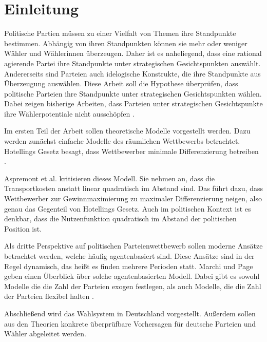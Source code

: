 
\chapter{Einleitung}\label{Kap-Einleitung}
Politische Partien müssen zu einer Vielfalt von Themen ihre Standpunkte bestimmen. Abhängig von ihren Standpunkten können sie mehr oder weniger Wähler und Wählerinnen überzeugen. Daher ist es naheliegend, dass eine rational agierende Partei ihre Standpunkte unter strategischen Gesichtspunkten auswählt. Andererseits sind Parteien auch idelogische Konstrukte, die ihre Standpunkte aus Überzeugung auswählen. Diese Arbeit soll die Hypothese überprüfen, dass politische Parteien ihre Standpunkte unter strategischen Gesichtspunkten wählen. Dabei zeigen bisherige Arbeiten, dass Parteien unter strategischen Gesichtspunkte ihre Wählerpotentiale nicht ausschöpfen \citep{schofield1998germany}.

Im ersten Teil der Arbeit sollen theoretische Modelle vorgestellt werden. Dazu werden  zunächst einfache Modelle des räumlichen Wettbewerbs betrachtet. Hotellings Gesetz besagt, dass Wettbewerber minimale Differenzierung betreiben \citep{hotelling1929}.

Aspremont et al. \citep{aspremont1979} kritisieren dieses Modell. Sie nehmen an, dass die Transportkosten anstatt linear quadratisch im Abstand sind. Das führt dazu, dass Wettbewerber zur Gewinnmaximierung zu maximaler Differenzierung neigen, also genau das Gegenteil von Hotellings Gesetz. Auch im politischen Kontext ist es denkbar, dass die Nutzenfunktion quadratisch im Abstand der politischen Position ist.

Als dritte Perspektive auf politischen Parteienwettbewerb sollen moderne Ansätze betrachtet werden, welche häufig agentenbasiert sind. Diese Ansätze sind in der Regel dynamisch, das heißt es finden mehrere Perioden statt. Marchi und Page \citep{marchi2014ABMs} geben einen Überblick über solche agentenbasierten Modell. Dabei gibt es sowohl Modelle die die Zahl der Parteien exogen festlegen, als auch Modelle, die die Zahl der Parteien flexibel halten \citep{laver2007endogenousParties}.

Abschließend wird das Wahlsystem in Deutschland vorgestellt. Außerdem sollen aus den Theorien konkrete überprüfbare Vorhersagen für deutsche Parteien und Wähler abgeleitet werden.


